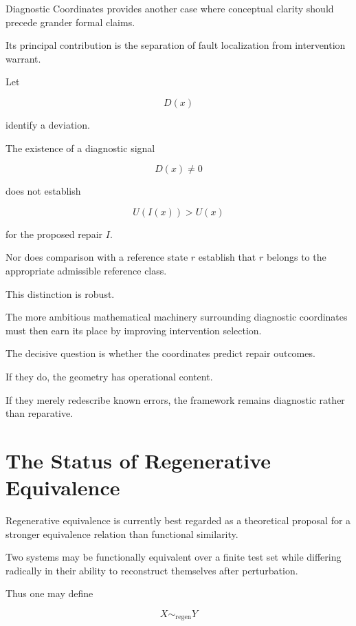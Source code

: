 \documentclass[11pt]{article}
\theoremstyle{remark}
\begin{document}
Diagnostic Coordinates provides another case where conceptual clarity should
precede grander formal claims.

Its principal contribution is the separation of fault localization from
intervention warrant.

Let

\begin{equation}
D(x)
\end{equation}

identify a deviation.

The existence of a diagnostic signal

\begin{equation}
D(x)\neq 0
\end{equation}

does not establish

\begin{equation}
U(I(x))>U(x)
\end{equation}

for the proposed repair $I$.

Nor does comparison with a reference state $r$ establish that $r$ belongs to
the appropriate admissible reference class.

This distinction is robust.

The more ambitious mathematical machinery surrounding diagnostic coordinates
must then earn its place by improving intervention selection.

The decisive question is whether the coordinates predict repair outcomes.

If they do, the geometry has operational content.

If they merely redescribe known errors, the framework remains diagnostic rather
than reparative.

\section{The Status of Regenerative Equivalence}

Regenerative equivalence is currently best regarded as a theoretical proposal
for a stronger equivalence relation than functional similarity.

Two systems may be functionally equivalent over a finite test set while
differing radically in their ability to reconstruct themselves after
perturbation.

Thus one may define

\begin{equation}
X\sim_{\mathrm{regen}}Y
\end{equation}
\end{document}
